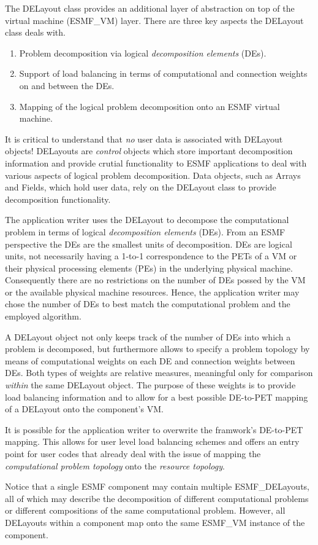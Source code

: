 
The DELayout class provides an additional layer of abstraction on top of the virtual machine (ESMF\_VM) layer. There are three key aspects the DELayout class deals with.

\begin{enumerate}

\item Problem decomposition via logical {\it decomposition elements} (DEs).

\item Support of load balancing in terms of computational and connection weights on and between the DEs. 

\item Mapping of the logical problem decomposition onto an ESMF virtual machine.

\end{enumerate}

It is critical to understand that {\it no} user data is associated with DELayout objects! DELayouts are {\it control} objects which store important decomposition information and provide crutial functionality to ESMF applications to deal with various aspects of logical problem decomposition. Data objects, such as Arrays and Fields, which hold user data, rely on the DELayout class to provide decomposition functionality.

The application writer uses the DELayout to decompose the computational problem in terms of logical {\it decomposition elements} (DEs). From an ESMF perspective the DEs are the smallest units of decomposition. DEs are logical units, not necessarily having a 1-to-1 correspondence to the PETs of a VM or their physical processing elements (PEs) in the underlying physical machine. Consequently there are no restrictions on the number of DEs possed by the VM or the available physical machine resources. Hence, the application writer may chose the number of DEs to best match the computational problem and the employed algorithm.

A DELayout object not only keeps track of the number of DEs into which a problem is decomposed, but furthermore allows to specify a problem topology by means of computational weights on each DE and connection weights between DEs. Both types of weights are relative measures, meaningful only for comparison {\it within} the same DELayout object. The purpose of these weights is to provide load balancing information and to allow for a best possible DE-to-PET mapping of a DELayout onto the component's VM.

It is possible for the application writer to overwrite the framwork's DE-to-PET mapping. This allows for user level load balancing schemes and offers an entry point for user codes that already deal with the issue of mapping the {\em computational problem topology} onto the {\em resource topology}.

Notice that a single ESMF component may contain multiple ESMF\_DELayouts, all of which may describe the decomposition of different computational problems or different compositions of the same computational problem. However, all DELayouts within a component map onto the same ESMF\_VM instance of the component.

